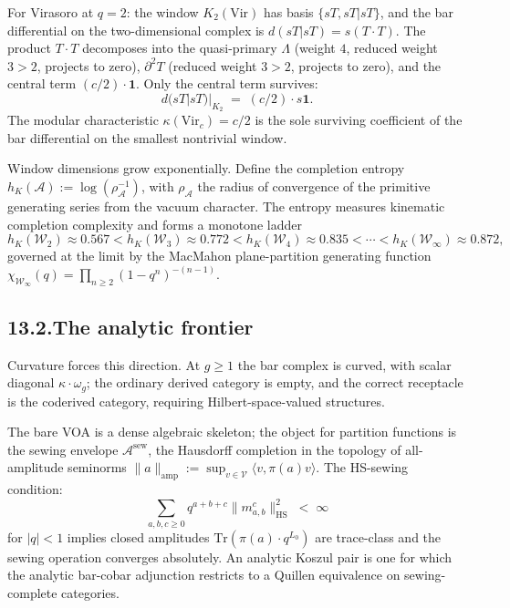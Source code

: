 \documentclass[11pt,reqno]{amsart}
\theoremstyle{definition}
\theoremstyle{remark}
\providecommand{\cA}{\mathcal{A}}
\providecommand{\cV}{\mathcal{V}}
\providecommand{\cW}{\mathcal{W}}
\providecommand{\Vir}{\mathrm{Vir}}
\providecommand{\Tr}{\mathrm{Tr}}
\numberwithin{equation}{section}
\begin{document}
For Virasoro at $q = 2$: the window $K_2(\Vir)$ has basis
$\{sT, sT|sT\}$, and the bar differential on the two-dimensional
complex is $d(sT|sT) = s(T\cdot T)$. The product $T\cdot T$
decomposes into the quasi-primary $\Lambda$ (weight $4$,
reduced weight $3 > 2$, projects to zero), $\partial^2 T$
(reduced weight $3 > 2$, projects to zero), and the central
term $(c/2)\cdot\mathbf 1$. Only the central term survives:
\[
d(sT|sT)|_{K_2} \;=\; (c/2)\cdot s\mathbf 1.
\]
The modular characteristic $\kappa(\Vir_c) = c/2$ is the sole
surviving coefficient of the bar differential on the smallest
nontrivial window.

Window dimensions grow exponentially. Define the completion
entropy $h_K(\cA) := \log(\rho_\cA^{-1})$, with $\rho_\cA$ the
radius of convergence of the primitive generating series from
the vacuum character. The entropy measures kinematic
completion complexity and forms a monotone ladder
\[
h_K(\cW_2) \approx 0.567
< h_K(\cW_3) \approx 0.772
< h_K(\cW_4) \approx 0.835
< \cdots
< h_K(\cW_\infty) \approx 0.872,
\]
governed at the limit by the MacMahon plane-partition
generating function
$\chi_{\cW_\infty}(q) = \prod_{n \ge 2}(1 - q^n)^{-(n-1)}$.

\subsection*{13.2.\enspace The analytic frontier}

Curvature forces this direction. At $g \ge 1$ the bar complex is
curved, with scalar diagonal $\kappa\cdot\omega_g$;
the ordinary derived category is empty, and the correct
receptacle is the coderived category, requiring
Hilbert-space-valued structures.

The bare VOA is a dense algebraic skeleton; the object for
partition functions is the sewing envelope $\cA^{\mathrm{sew}}$,
the Hausdorff completion in the topology of all-amplitude
seminorms $\|a\|_{\mathrm{amp}} := \sup_{v \in \cV}
\langle v, \pi(a) v\rangle$. The HS-sewing condition:
\[
\sum_{a,b,c \ge 0} q^{a+b+c}\|m^c_{a,b}\|^2_{\mathrm{HS}}
\;<\;\infty
\]
for $|q| < 1$ implies closed amplitudes
$\Tr(\pi(a)\cdot q^{L_0})$ are trace-class and the sewing
operation converges absolutely. An analytic Koszul pair is
one for which the analytic bar-cobar adjunction restricts to a
Quillen equivalence on sewing-complete categories.
\end{document}
